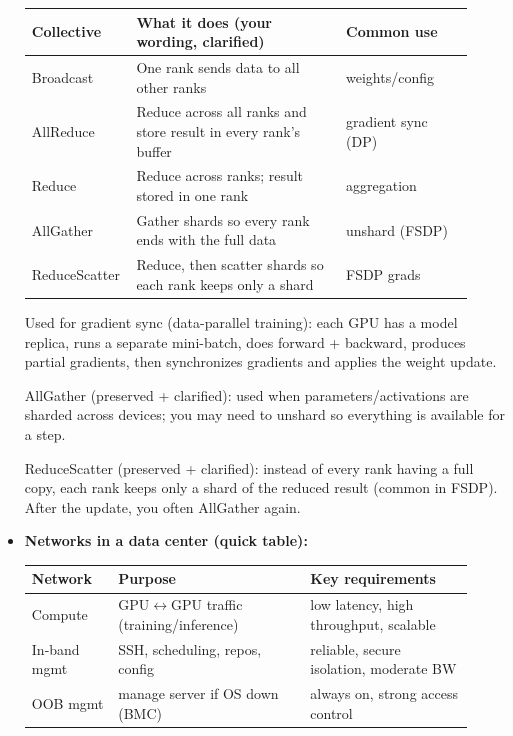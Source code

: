 \documentclass[11pt]{article}
\newcommand{\blue}[1]{\textcolor{myblue}{#1}}
\newcommand{\term}[1]{\textbf{\blue{#1}}}
\begin{document}
\begin{itemize}[leftmargin=1.2em]
    \begin{center}
    \renewcommand{\arraystretch}{1.15}
    \begin{tabular}{|p{0.18\linewidth}|p{0.46\linewidth}|p{0.28\linewidth}|}
    \hline
    \textbf{Collective} & \textbf{What it does (your wording, clarified)} & \textbf{Common use} \\
    \hline
    Broadcast & One rank sends data to all other ranks & weights/config \\
    \hline
    AllReduce & Reduce across all ranks and store result in every rank’s buffer & gradient sync (DP) \\
    \hline
    Reduce & Reduce across ranks; result stored in one rank & aggregation \\
    \hline
    AllGather & Gather shards so every rank ends with the full data & unshard (FSDP) \\
    \hline
    ReduceScatter & Reduce, then scatter shards so each rank keeps only a shard & FSDP grads \\
    \hline
    \end{tabular}
    \end{center}
    
    Used for gradient sync (data-parallel training): each GPU has a model replica, runs a separate mini-batch, does forward + backward, produces partial gradients, then synchronizes gradients and applies the weight update.
    
    AllGather (preserved + clarified): used when parameters/activations are sharded across devices; you may need to unshard so everything is available for a step.
    
    ReduceScatter (preserved + clarified): instead of every rank having a full copy, each rank keeps only a shard of the reduced result (common in FSDP). After the update, you often AllGather again.
    
    \item \term{Networks in a data center (quick table):}
    \begin{center}
    \renewcommand{\arraystretch}{1.15}
    \begin{tabular}{|p{0.18\linewidth}|p{0.40\linewidth}|p{0.34\linewidth}|}
    \hline
    \textbf{Network} & \textbf{Purpose} & \textbf{Key requirements} \\
    \hline
    Compute & GPU$\leftrightarrow$GPU traffic (training/inference) & low latency, high throughput, scalable \\
    \hline
    In-band mgmt & SSH, scheduling, repos, config & reliable, secure isolation, moderate BW \\
    \hline
    OOB mgmt & manage server if OS down (BMC) & always on, strong access control \\
    \hline
    \end{tabular}
    \end{center}
    

\end{itemize}
\end{document}

